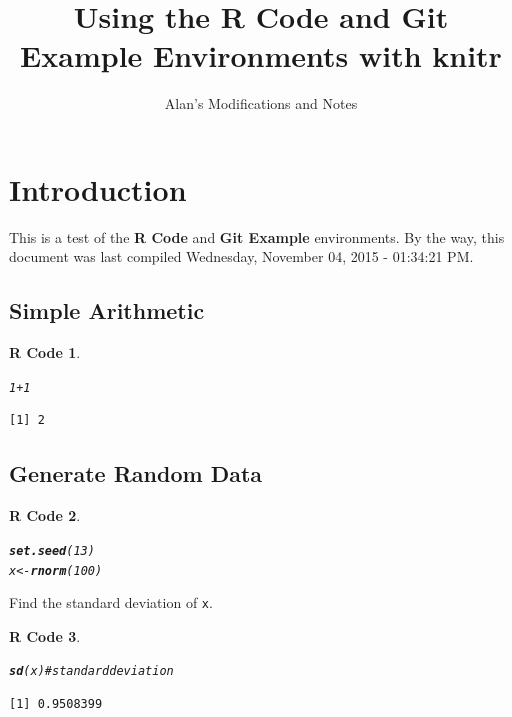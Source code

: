 \documentclass{article}\usepackage[]{graphicx}\usepackage[]{color}
\title{Using the \textbf{R Code} and {\bfseries{Git Example}} Environments with \textbf{knitr}}
\author{Alan's Modifications and Notes}
\makeatletter
\newcommand{\hlnum}[1]{\textcolor[rgb]{0.686,0.059,0.569}{#1}}%
\newcommand{\hlcom}[1]{\textcolor[rgb]{0.678,0.584,0.686}{\textit{#1}}}%
\newcommand{\hlopt}[1]{\textcolor[rgb]{0,0,0}{#1}}%
\newcommand{\hlstd}[1]{\textcolor[rgb]{0.345,0.345,0.345}{#1}}%
\newcommand{\hlkwb}[1]{\textcolor[rgb]{0.69,0.353,0.396}{#1}}%
\newcommand{\hlkwd}[1]{\textcolor[rgb]{0.737,0.353,0.396}{\textbf{#1}}}%
\newenvironment{kframe}{%
 \def\at@end@of@kframe{}%
 \ifinner\ifhmode%
  \def\at@end@of@kframe{\end{minipage}}%
  \begin{minipage}{\columnwidth}%
 \fi\fi%
 \def\FrameCommand##1{\hskip\@totalleftmargin \hskip-\fboxsep
 \colorbox{shadecolor}{##1}\hskip-\fboxsep
     \hskip-\linewidth \hskip-\@totalleftmargin \hskip\columnwidth}%
 \MakeFramed {\advance\hsize-\width
   \@totalleftmargin\z@ \linewidth\hsize
   \@setminipage}}%
 {\par\unskip\endMakeFramed%
 \at@end@of@kframe}
\newenvironment{knitrout}{}{} %
\theoremstyle{rcode}
\newtheorem{rcode}{R Code}[section]
\newcommand{\noind}{\setlength{\parindent}{0pt}}
\makeatother
\begin{document}
\maketitle




\section{Introduction}

This is a test of the \textbf{R Code} and \textbf{Git Example} environments.  By the way,
this document was last compiled Wednesday, November 04, 2015 - 01:34:21 PM.

\subsection{Simple Arithmetic}

\begin{knitrout}
\color{fgcolor}\begin{kframe}
\begin{rcode}\label{test-a}\hfill{}\begin{alltt}
\hlnum{1} \hlopt{+} \hlnum{1}
\end{alltt}
\begin{verbatim}
[1] 2
\end{verbatim}
\end{rcode}\end{kframe}
\end{knitrout}


\subsection{Generate Random Data}

\begin{knitrout}
\color{fgcolor}\begin{kframe}
\begin{rcode}\label{test-b}\hfill{}\begin{alltt}
\hlkwd{set.seed}\hlstd{(}\hlnum{13}\hlstd{)}
\hlstd{x} \hlkwb{<-} \hlkwd{rnorm}\hlstd{(}\hlnum{100}\hlstd{)}
\end{alltt}
\end{rcode}\end{kframe}
\end{knitrout}
\noind
Find the standard deviation of \texttt{x}.

\begin{knitrout}
\color{fgcolor}\begin{kframe}
\begin{rcode}\label{test-c}\hfill{}\begin{alltt}
\hlkwd{sd}\hlstd{(x)} \hlcom{# standard deviation   }
\end{alltt}
\begin{verbatim}
[1] 0.9508399
\end{verbatim}
\end{rcode}\end{kframe}
\end{knitrout}
\end{document}
